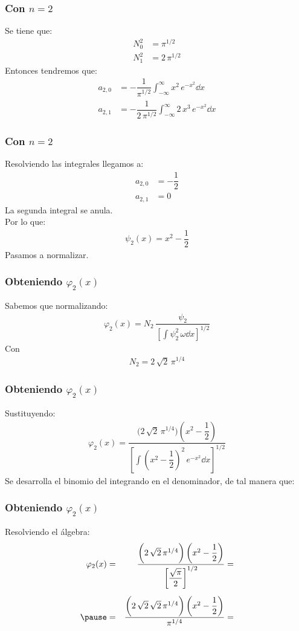 \begin{frame}
\frametitle{Con $n =  2$}
Se tiene que:
\begin{align*}
N_{0}^{2} &= \pi^{1/2} \\[0.5em]
N_{1}^{2} &= 2 \, \pi^{1/2}
\end{align*}
\pause
Entonces tendremos que:
\begin{align*}
a_{2,0} &= - \dfrac{1}{\pi^{1/2}} \int_{-\infty}^{\infty} x^{2} \, e^{-x^{2}} \dd{x} \\[0.5em]
a_{2,1} &= - \dfrac{1}{2 \, \pi^{1/2}} \int_{-\infty}^{\infty} 2\, x^{3} \, e^{-x^{2}} \dd{x}
\end{align*}
\end{frame}
\begin{frame}
\frametitle{Con $n =  2$}
Resolviendo las integrales llegamos a:
\begin{align*}
a_{2,0} &= - \dfrac{1}{2} \\[0.5em]
a_{2,1} &= 0
\end{align*}
La segunda integral se anula.
\\
\pause
Por lo que:
\begin{align*}
\psi_{2} (x) = x^{2} - \dfrac{1}{2}
\end{align*}
Pasamos a normalizar.
\end{frame}
\begin{frame}
\frametitle{Obteniendo $\varphi_{2}(x)$}
Sabemos que normalizando:
\begin{align*}
\varphi_{2} (x) = N_{2} \, \dfrac{ \psi_{2}}{\left[ \displaystyle \int \psi_{2}^{2} \, \omega \dd{x} \right]^{1/2}}
\end{align*}
\pause
Con
\begin{align*}
N_{2} = 2 \, \sqrt{2} \, \pi^{1/4}
\end{align*}
\end{frame}
\begin{frame}
\frametitle{Obteniendo $\varphi_{2}(x)$}
Sustituyendo:
\begin{align*}
\varphi_{2} (x) = \dfrac{\bigg(2 \, \sqrt{2} \, \pi^{1/4} \bigg) \left(x^{2} - \dfrac{1}{2} \right)}{\left[ \displaystyle \int \left(x^{2} - \dfrac{1}{2} \right)^{2} \, e^{-x^{2}} \dd{x} \right]^{1/2}}
\end{align*}
\pause
Se desarrolla el binomio del integrando en el denominador, de tal manera que:
\end{frame}
\begin{frame}
\frametitle{Obteniendo $\varphi_{2}(x)$}
Resolviendo el álgebra:
\begin{eqnarray*}
\varphi_{2} (x) &=& \dfrac{\bigg(2 \, \sqrt{2} \, \pi^{1/4} \bigg) \left(x^{2} - \dfrac{1}{2} \right)}{\left[ \dfrac{\sqrt{\pi}}{2}\right]^{1/2}} = \\[0.5em] \pause
&=& \dfrac{\bigg(2 \, \sqrt{2} \, \sqrt{2} \, \pi^{1/4} \bigg) \left(x^{2} - \dfrac{1}{2} \right)}{\pi^{1/4}} =
\end{eqnarray*}
\end{frame}
